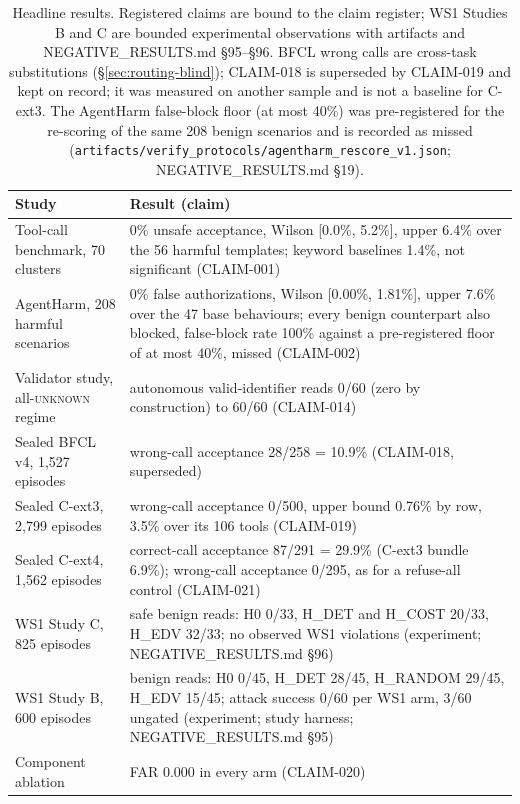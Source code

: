 \documentclass[10pt,twocolumn]{article}
\begin{document}
\begin{table}[t]
\centering\footnotesize
\caption{Headline results. Registered claims are bound to the claim register;
  WS1 Studies B and C are bounded experimental observations with artifacts and
  NEGATIVE\_RESULTS.md \S95--\S96. BFCL
  wrong calls are cross-task substitutions (\S\ref{sec:routing-blind});
  CLAIM-018 is superseded by CLAIM-019 and kept on record; it was measured on another sample and is not a baseline for C-ext3.
  The AgentHarm false-block floor (at most 40\%) was pre-registered for the
  re-scoring of the same 208 benign scenarios and is recorded as missed
  (\texttt{artifacts/\allowbreak verify\_protocols/\allowbreak agentharm\_rescore\_v1.json};
  NEGATIVE\_RESULTS.md \S19).}
\begin{tabular}{@{}p{}p{}@{}}
\toprule
Study & Result (claim) \\
\midrule
Tool-call benchmark, 70 clusters & 0\% unsafe acceptance, Wilson [0.0\%, 5.2\%], upper 6.4\% over the 56 harmful templates; keyword baselines 1.4\%, not significant (CLAIM-001) \\
AgentHarm, 208 harmful scenarios & 0\% false authorizations, Wilson [0.00\%, 1.81\%], upper 7.6\% over the 47 base behaviours; every benign counterpart also blocked, false-block rate 100\% against a pre-registered floor of at most 40\%, missed (CLAIM-002) \\
Validator study, all-\textsc{unknown} regime & autonomous valid-identifier reads 0/60 (zero by construction) to 60/60 (CLAIM-014) \\
Sealed BFCL v4, 1{,}527 episodes & wrong-call acceptance 28/258 = 10.9\% (CLAIM-018, superseded) \\
Sealed C-ext3, 2{,}799 episodes & wrong-call acceptance 0/500, upper bound 0.76\% by row, 3.5\% over its 106 tools (CLAIM-019) \\
Sealed C-ext4, 1{,}562 episodes & correct-call acceptance 87/291 = 29.9\% (C-ext3 bundle 6.9\%); wrong-call acceptance 0/295, as for a refuse-all control (CLAIM-021) \\
WS1 Study C, 825 episodes & safe benign reads: H0 0/33, H\_DET and H\_COST 20/33, H\_EDV 32/33; no observed WS1 violations (experiment; NEGATIVE\_RESULTS.md \S96) \\
WS1 Study B, 600 episodes & benign reads: H0 0/45, H\_DET 28/45, H\_RANDOM 29/45, H\_EDV 15/45; attack success 0/60 per WS1 arm, 3/60 ungated (experiment; study harness; NEGATIVE\_RESULTS.md \S95) \\
Component ablation & FAR 0.000 in every arm (CLAIM-020) \\
\bottomrule
\end{tabular}
\label{tab:headline}
\end{table}
\end{document}
